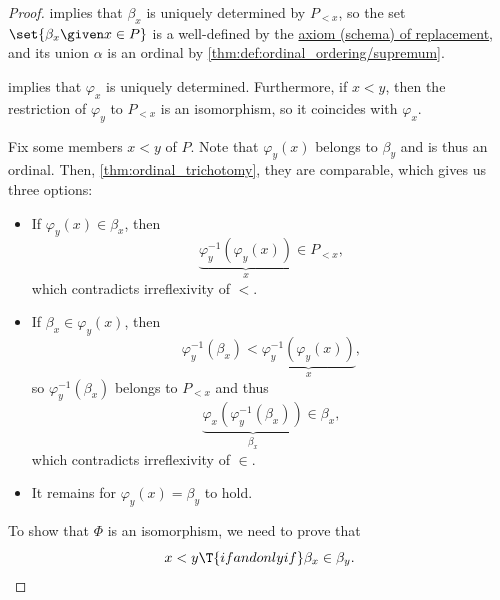 \begin{proof}
    implies that \( \beta_x \) is uniquely determined by \( P_{<x} \), so the set \( \set{ \beta_x \given x \in P } \) is a well-defined by the \hyperref[def:zfc/replacement]{axiom (schema) of replacement}, and its union \( \alpha \) is an ordinal by \cref{thm:def:ordinal_ordering/supremum}.

    implies that \( \varphi_x \) is uniquely determined. Furthermore, if \( x < y \), then the restriction of \( \varphi_y \) to \( P_{<x} \) is an isomorphism, so it coincides with \( \varphi_x \).

  Fix some members \( x < y \) of \( P \). Note that \( \varphi_y(x) \) belongs to \( \beta_y \) and is thus an ordinal. Then, \cref{thm:ordinal_trichotomy}, they are comparable, which gives us three options:
  \begin{itemize}
    \item If \( \varphi_y(x) \in \beta_x \), then
    \begin{equation*}
      \underbrace{\varphi_y^{-1}(\varphi_y(x))}_x \in P_{<x},
    \end{equation*}
    which contradicts irreflexivity of \( {<} \).

    \item If \( \beta_x \in \varphi_y(x) \), then
    \begin{equation*}
      \varphi_y^{-1}(\beta_x) < \underbrace{\varphi_y^{-1}(\varphi_y(x))}_x,
    \end{equation*}
    so \( \varphi_y^{-1}(\beta_x) \) belongs to \( P_{<x} \) and thus
    \begin{equation*}
      \underbrace{\varphi_x(\varphi_y^{-1}(\beta_x))}_{\beta_x} \in \beta_x,
    \end{equation*}
    which contradicts irreflexivity of \( {\in} \).

    \item It remains for \( \varphi_y(x) = \beta_y \) to hold.
  \end{itemize}

   To show that \( \Phi \) is an isomorphism, we need to prove that
  \begin{equation*}
    x < y \T{if and only if} \beta_x \in \beta_y.
  \end{equation*}


\end{proof}
